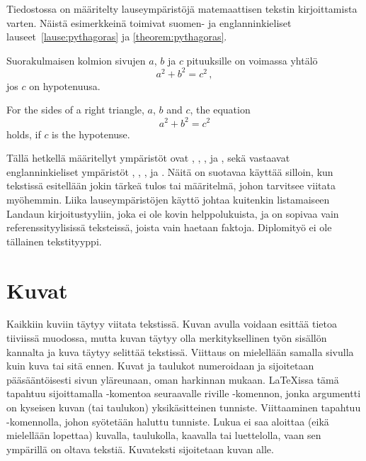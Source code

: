 Tiedostossa  on määritelty lauseympäristöjä matemaattisen
tekstin kirjoittamista varten. Näistä esimerkkeinä toimivat suomen- ja
englanninkieliset lauseet~\ref{lause:pythagoras} ja \ref{theorem:pythagoras}.

\begin{lause}\label{lause:pythagoras}
    Suorakulmaisen kolmion sivujen \(a\), \(b\) ja \(c\) pituuksille on voimassa yhtälö
    \begin{equation}\label{yht:pythagoras}
        a^2 + b^2 = c^2\,,
    \end{equation}
    jos \(c\) on hypotenuusa.
\end{lause}

\begin{theorem}\label{theorem:pythagoras}
    For the sides of a right triangle, \(a\), \(b\) and \(c\), the equation
    \begin{equation}\label{eq:pythagoras}
        a^2 + b^2 = c^2
    \end{equation}
    holds, if \(c\) is the hypotenuse.
\end{theorem}

Tällä hetkellä määritellyt ympäristöt ovat , ,
,  ja , sekä vastaavat
englanninkieliset ympäristöt , , ,
 ja . Näitä on suotavaa käyttää silloin, kun
tekstissä esitellään jokin tärkeä tulos tai määritelmä, johon tarvitsee
viitata myöhemmin. Liika lauseympäristöjen käyttö johtaa kuitenkin
listamaiseen Landaun kirjoitustyyliin, joka ei ole kovin helppolukuista, ja on
sopivaa vain referenssityylisissä teksteissä, joista vain haetaan faktoja.
Diplomityö ei ole tällainen tekstityyppi.


\section{Kuvat}

Kaikkiin kuviin täytyy viitata tekstissä. Kuvan avulla voidaan esittää tietoa tiiviissä muodossa, mutta kuvan täytyy olla merkityksellinen työn sisällön kannalta ja kuva täytyy selittää tekstissä. Viittaus on mielellään samalla sivulla kuin kuva tai sitä ennen. Kuvat ja taulukot numeroidaan ja sijoitetaan pääsääntöisesti sivun yläreunaan, oman harkinnan mukaan. \LaTeX{}issa tämä tapahtuu sijoittamalla -komentoa seuraavalle riville -komennon, jonka argumentti on kyseisen kuvan (tai taulukon) yksikäsitteinen tunniste. Viittaaminen tapahtuu -komennolla, johon syötetään haluttu tunniste. Lukua ei saa aloittaa (eikä mielellään lopettaa) kuvalla, taulukolla, kaavalla tai luettelolla, vaan sen ympärillä on oltava tekstiä. Kuvateksti sijoitetaan kuvan alle.

